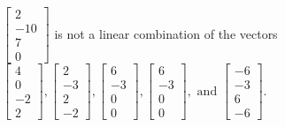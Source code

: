 \begin{exercise}
\begin{exerciseStatement}
  \end{exerciseStatement}
  \begin{exerciseAnswer}
   \(\left[\begin{array}{c}
2 \\
-10 \\
7 \\
0
\end{array}\right]\) 
  	 is not  
	a linear combination of the vectors \(\left[\begin{array}{c}
4 \\
0 \\
-2 \\
2
\end{array}\right] , \left[\begin{array}{c}
2 \\
-3 \\
2 \\
-2
\end{array}\right] , \left[\begin{array}{c}
6 \\
-3 \\
0 \\
0
\end{array}\right] , \left[\begin{array}{c}
6 \\
-3 \\
0 \\
0
\end{array}\right] , \text{ and } \left[\begin{array}{c}
-6 \\
-3 \\
6 \\
-6
\end{array}\right]\).

	
  


  \end{exerciseAnswer}
\end{exercise}